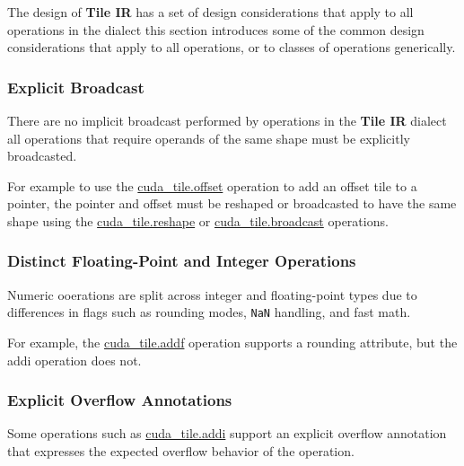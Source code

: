 \documentclass{article}
\begin{document}
The design of \textbf{Tile IR} has a set of design considerations that apply to all operations in the dialect this section introduces some of the common design considerations that apply to all operations, or to classes of operations generically.


\subsubsection{Explicit Broadcast}

There are no implicit broadcast performed by operations in the \textbf{Tile IR} dialect all operations that require operands of the same shape must be explicitly broadcasted.

For example to use the \href{https://docs.nvidia.com/cuda/tile-ir/latest/sections/operations.html#op-cuda-tile-offset}{cuda\_tile.offset} operation to add an offset tile to a pointer, the pointer and offset must be reshaped or broadcasted to have the same shape using the \href{https://docs.nvidia.com/cuda/tile-ir/latest/sections/operations.html#op-cuda-tile-reshape}{cuda\_tile.reshape} or \href{https://docs.nvidia.com/cuda/tile-ir/latest/sections/operations.html#op-cuda-tile-broadcast}{cuda\_tile.broadcast} operations.



\subsubsection{Distinct Floating-Point and Integer Operations}

Numeric ooerations are split across integer and floating-point types due to differences in flags such as rounding modes, \texttt{NaN} handling, and fast math.


For example, the \href{https://docs.nvidia.com/cuda/tile-ir/latest/sections/operations.html#op-cuda-tile-addf}{cuda\_tile.addf} operation supports a rounding attribute, but the addi operation does not.



\subsubsection{Explicit Overflow Annotations}

Some operations such as \href{https://docs.nvidia.com/cuda/tile-ir/latest/sections/operations.html#op-cuda-tile-addi}{cuda\_tile.addi} support an explicit overflow annotation that expresses the expected overflow behavior of the operation.
\end{document}
